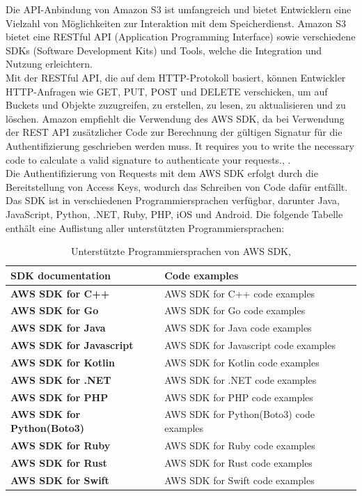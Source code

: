 Die API-Anbindung von Amazon S3 ist umfangreich und bietet Entwicklern eine Vielzahl von Möglichkeiten zur Interaktion mit dem Speicherdienst. Amazon S3 bietet eine RESTful API (Application Programming Interface) sowie verschiedene SDKs (Software Development Kits) und Tools, welche die Integration und Nutzung erleichtern.\\

Mit der RESTful API, die auf dem HTTP-Protokoll basiert, können Entwickler HTTP-Anfragen wie GET, PUT, POST und DELETE verschicken, um auf Buckets und Objekte zuzugreifen, zu erstellen, zu lesen, zu aktualisieren und zu löschen. Amazon empfiehlt die Verwendung des AWS SDK, da bei Verwendung der REST API zusätzlicher Code zur Berechnung der gültigen Signatur für die Authentifizierung geschrieben werden muss. \glqq It requires you to write the necessary code to calculate a valid signature to authenticate your requests.\grqq, \cite{aws-api}.\\

Die Authentifizierung von Requests mit dem AWS SDK erfolgt durch die Bereitstellung von Access Keys, wodurch das Schreiben von Code dafür entfällt. Das SDK ist in verschiedenen Programmiersprachen verfügbar, darunter Java, JavaScript, Python, .NET, Ruby, PHP, iOS und Android. Die folgende Tabelle enthält eine Auflistung aller unterstützten Programmiersprachen:

\begin{table}[!h]
\centering
\begin{tabular}{ |p{5.5cm}|p{7cm}| }
\hline
\rowcolor{gray!30}
\textbf{SDK documentation} & \textbf{Code examples}\\
\hline
\textbf{AWS SDK for C++} & AWS SDK for C++ code examples\\
\textbf{AWS SDK for Go} & AWS SDK for Go code examples\\
\textbf{AWS SDK for Java}   & AWS SDK for Java code examples\\
\textbf{AWS SDK for Javascript}  & AWS SDK for Javascript code examples\\
\textbf{AWS SDK for Kotlin} & AWS SDK for Kotlin code examples\\
\textbf{AWS SDK for .NET} & AWS SDK for .NET code examples\\
\textbf{AWS SDK for PHP} & AWS SDK for PHP code examples\\
\textbf{AWS SDK for Python(Boto3)} & AWS SDK for Python(Boto3) code examples\\
\textbf{AWS SDK for Ruby} & AWS SDK for Ruby code examples\\
\textbf{AWS SDK for Rust} & AWS SDK for Rust code examples\\
\textbf{AWS SDK for Swift} & AWS SDK for Swift code examples\\
\hline
\end{tabular}
\caption{Unterstützte Programmiersprachen von AWS SDK, }
\end{table}

